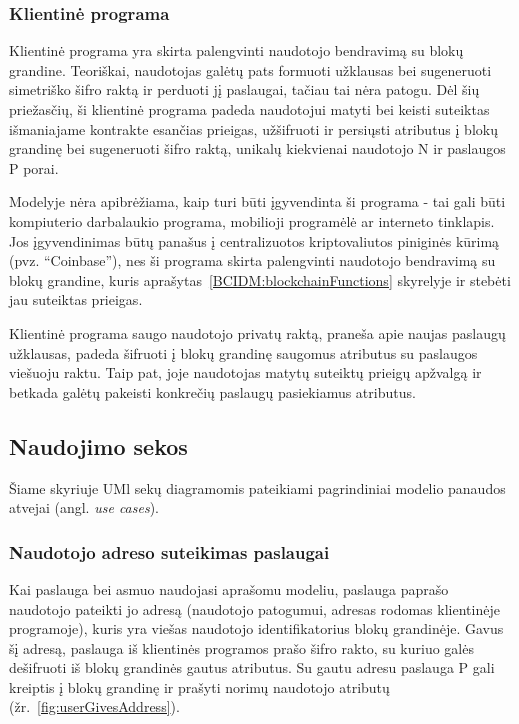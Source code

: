 \subsubsection{Klientinė programa}

Klientinė programa yra skirta palengvinti naudotojo bendravimą su blokų grandine. Teoriškai, naudotojas galėtų pats formuoti užklausas
bei sugeneruoti simetriško šifro raktą ir perduoti jį paslaugai, tačiau tai nėra patogu. Dėl šių priežasčių, ši klientinė
programa padeda naudotojui matyti bei keisti suteiktas išmaniajame kontrakte esančias prieigas, užšifruoti ir persiųsti atributus į blokų grandinę
bei sugeneruoti šifro raktą, unikalų kiekvienai naudotojo N ir paslaugos P porai.

Modelyje nėra apibrėžiama, kaip turi būti įgyvendinta ši programa - tai gali būti kompiuterio darbalaukio programa,
mobilioji programėlė ar 
interneto tinklapis. Jos įgyvendinimas būtų panašus į centralizuotos kriptovaliutos piniginės kūrimą (pvz. \enquote{Coinbase}), nes ši
programa skirta palengvinti naudotojo bendravimą su blokų grandine, kuris aprašytas~\ref{BCIDM:blockchainFunctions} skyrelyje ir
stebėti jau suteiktas prieigas.

Klientinė programa saugo naudotojo privatų raktą, praneša apie naujas paslaugų užklausas, padeda šifruoti
į blokų grandinę saugomus atributus su paslaugos viešuoju raktu. Taip pat, joje naudotojas
matytų suteiktų prieigų apžvalgą ir betkada galėtų pakeisti konkrečių paslaugų pasiekiamus atributus.

\subsection{Naudojimo sekos}

Šiame skyriuje UMl sekų diagramomis pateikiami pagrindiniai modelio panaudos atvejai (angl. \textit{use cases}).

\subsubsection{Naudotojo adreso suteikimas paslaugai}

Kai paslauga bei asmuo naudojasi aprašomu modeliu, paslauga paprašo naudotojo pateikti jo adresą (naudotojo patogumui, adresas rodomas
klientinėje programoje),
kuris yra viešas naudotojo identifikatorius blokų grandinėje.
Gavus šį adresą, paslauga iš klientinės programos prašo šifro rakto, su kuriuo galės dešifruoti iš blokų grandinės gautus atributus.
Su gautu adresu paslauga P gali kreiptis į blokų grandinę ir prašyti norimų naudotojo atributų (žr.~\ref{fig:userGivesAddress}).

